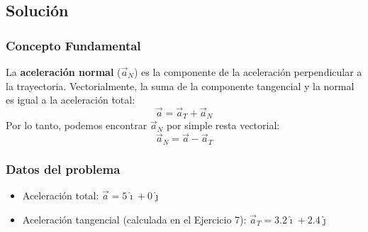 \documentclass[12pt, a4paper]{article}
\begin{document}
\begin{center}
\end{center}

\subsection*{Solución}

\subsubsection*{Concepto Fundamental}
La \textbf{aceleración normal} ($\vec{a}_N$) es la componente de la aceleración perpendicular a la trayectoria. Vectorialmente, la suma de la componente tangencial y la normal es igual a la aceleración total:
$$ \vec{a} = \vec{a}_T + \vec{a}_N $$
Por lo tanto, podemos encontrar $\vec{a}_N$ por simple resta vectorial:
\begin{equation}
\vec{a}_N = \vec{a} - \vec{a}_T
\end{equation}

\subsubsection*{Datos del problema}
\begin{itemize}
    \item Aceleración total: $\vec{a} = 5\hat{\imath} + 0\hat{\jmath}$
    \item Aceleración tangencial (calculada en el Ejercicio 7): $\vec{a}_T = 3.2\hat{\imath} + 2.4\hat{\jmath}$
\end{itemize}
\end{document}
